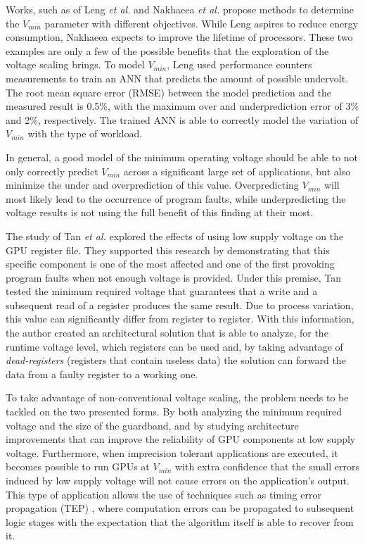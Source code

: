 Works, such as of Leng \textit{et al.} \cite{leng_safe_2015} and Nakhaeea  \textit{et al.} \cite{nakhaee_lifetime_2018} propose methods to determine the $V_{min}$ parameter with different objectives. While Leng aspires to reduce energy consumption, Nakhaeea expects to improve the lifetime of processors. These two examples are only a few of the possible benefits that the exploration of the voltage scaling brings. To model $V_{min}$, Leng used performance counters measurements to train an ANN that predicts the amount of possible undervolt. The root mean square error (RMSE) between the model prediction and the measured result is 0.5\%, with the maximum over and underprediction error of 3\% and 2\%, respectively. The trained ANN is able to correctly model the variation of $V_{min}$ with the type of workload.

In general, a good model of the minimum operating voltage should be able to not only correctly predict  $V_{min}$ across a significant large set of applications, but also minimize the under and overprediction of this value. Overpredicting $V_{min}$ will most likely lead to the occurrence of program faults, while underpredicting the voltage results is not using the full benefit of this finding at their most.

The study of Tan \textit{et al.} \cite{tan_combating_2016} explored the effects of using low supply voltage on the GPU register file. They supported this research by demonstrating that this specific component is one of the most affected and one of the first provoking program faults when not enough voltage is provided. Under this premise, Tan tested the minimum required voltage that guarantees that a write and a subsequent read of a register produces the same result. Due to process variation, this value can significantly differ from register to register. With this information, the author created an architectural solution that is able to analyze, for the runtime voltage level, which registers can be used and, by taking advantage of \textit{dead-registers} (registers that contain useless data) the solution can forward the data from a faulty register to a working one.

To take advantage of non-conventional voltage scaling, the problem needs to be tackled on the two presented forms. By both analyzing the minimum required voltage and the size of the guardband, and by studying architecture improvements that can improve the reliability of GPU components at low supply voltage. Furthermore, when imprecision tolerant applications are executed, it becomes possible to run GPUs at $V_{min}$ with extra confidence that the small errors induced by low supply voltage will not cause errors on the application's output. This type of application allows the use of techniques such as timing error propagation (TEP) \cite{nakhaee_lifetime_2018}, where computation errors can be propagated to subsequent logic stages with the expectation that the algorithm itself is able to recover from it.

